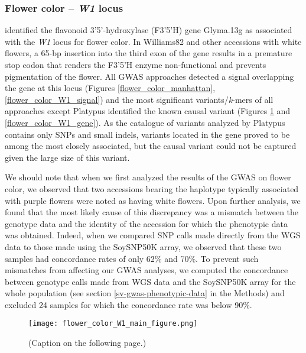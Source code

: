 \subsubsection{Flower color -- \textit{W1} locus}
\label{sv-gwas-main-results-flower-color-l1}

\cite{zabala2007} identified the flavonoid 3’5’-hydroxylase (F3’5’H) gene
Glyma.13g as associated with the \textit{W1} locus for flower color. In
Williams82 and other accessions with white flowers, a 65-bp insertion into the
third exon of the gene results in a premature stop codon that renders the
F3’5’H enzyme non-functional and prevents pigmentation of the flower. All
GWAS approaches detected a signal overlapping the gene at this locus (Figures
\ref{flower_color_manhattan}, \ref{flower_color_W1_signal}) and the most
significant variants/\textit{k}-mers of all approaches except Platypus identified
the known causal variant (Figures \ref{flower-color-main-figure} and
\ref{flower_color_W1_gene}).
As the catalogue of variants analyzed by Platypus contains only SNPs and small
indels, variants located in the gene proved to be among the most closely
associated, but the causal variant could not be captured given the large size
of this variant.

We should note that when we first analyzed the results of the GWAS on flower
color, we observed that two accessions bearing the haplotype typically
associated with purple flowers were noted as having white flowers. Upon further
analysis, we found that the most likely cause of this discrepancy was a
mismatch between the genotype data and the identity of the accession for which
the phenotypic data was obtained. Indeed, when we compared SNP calls made
directly from the WGS data to those made using the SoySNP50K array, we observed
that these two samples had concordance rates of only 62\% and 70\%. To
prevent such mismatches from affecting our GWAS analyses, we computed the
concordance between genotype calls made from WGS data and the SoySNP50K array
for the whole population (see section \ref{sv-gwas-phenotypic-data} in the Methods) and
excluded 24 samples for which the concordance rate was below 90\%.

\begin{figure}
	\centering
	\texttt{[image: flower\_color\_W1\_main\_figure.png]}
	\caption[Results of SV- and \textit{k}-mer-based GWAS at the
	\textit{W1} locus for flower color]{(Caption on the following page.)}
	\label{flower-color-main-figure}
\end{figure}

